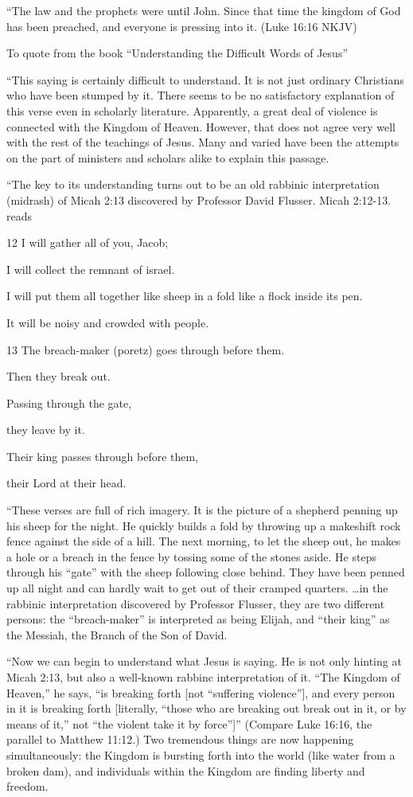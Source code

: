 \documentclass[11pt]{article}
\begin{document}
“The law and the prophets were until John. Since that time
the kingdom of God has been preached, and everyone is pressing into
it. (Luke 16:16 NKJV)

To quote from the book “Understanding the Difficult Words of Jesus”

“This saying is certainly difficult to understand. It is not just
ordinary Christians who have been stumped by it. There seems to be no
satisfactory explanation of this verse even in scholarly literature.
Apparently, a great deal of violence is connected with the Kingdom of
Heaven. However, that does not agree very well with the rest of the
teachings of Jesus. Many and varied have been the attempts on the part
of ministers and scholars alike to explain this passage.

“The key to its understanding turns out to be an old rabbinic
interpretation (midrash) of Micah 2:13 discovered by Professor David
Flusser. Micah 2:12-13. reads

12 I will gather all of you, Jacob;

I will collect the remnant of israel.

I will put them all together like sheep in a fold like a flock inside its pen.

It will be noisy and crowded with people.

13 The breach-maker (poretz) goes through before them.

Then they break out.

Passing through the gate,

they leave by it.

Their king passes through before them,

their Lord at their head.

“These verses are full of rich imagery. It is the picture of a
shepherd penning up his sheep for the night. He quickly builds a fold
by throwing up a makeshift rock fence against the side of a hill. The
next morning, to let the sheep out, he makes a hole or a breach in the
fence by tossing some of the stones aside. He steps through his “gate”
with the sheep following close behind. They have been penned up all
night and can hardly wait to get out of their cramped quarters. …in
the rabbinic interpretation discovered by Professor Flusser, they are
two different persons: the “breach-maker” is interpreted as being
Elijah, and “their king” as the Messiah, the Branch of the Son of
David.

“Now we can begin to understand what Jesus is saying. He is not only
hinting at Micah 2:13, but also a well-known rabbinc interpretation of
it. “The Kingdom of Heaven,” he says, “is breaking forth [not
“suffering violence”], and every person in it is breaking forth [literally, “those who are breaking out break out in it, or by means of it,” not “the violent take it by force”]” (Compare Luke 16:16, the parallel to Matthew 11:12.) Two tremendous things are now happening simultaneously: the Kingdom is bursting forth into the world (like water from a broken dam), and individuals within the Kingdom are finding liberty and freedom.
\end{document}
